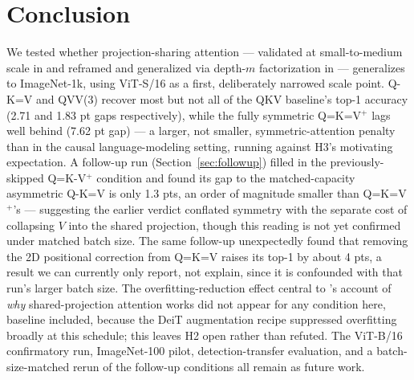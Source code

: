 \documentclass[11pt]{article}
\begin{document}
\section{Conclusion}
\label{sec:conclusion}
We tested whether projection-sharing attention --- validated at
small-to-medium scale in \citet{kayyam2026three} and reframed and
generalized via depth-\(m\) factorization in \citet{gao2026keyless} ---
generalizes to ImageNet-1k, using ViT-S/16 as a first, deliberately narrowed
scale point. Q-K=V and QVV(3) recover most but not all of the QKV baseline's
top-1 accuracy (2.71 and 1.83 pt gaps respectively), while the fully
symmetric Q=K=V\(^+\) lags well behind (7.62 pt gap) --- a larger, not
smaller, symmetric-attention penalty than in the causal language-modeling
setting, running against H3's motivating expectation. A follow-up run
(Section~\ref{sec:followup}) filled in the previously-skipped Q=K-V\(^+\)
condition and found its gap to the matched-capacity asymmetric Q-K=V is only
1.3 pts, an order of magnitude smaller than Q=K=V\(^+\)'s --- suggesting the
earlier verdict conflated symmetry with the separate cost of collapsing
\(V\) into the shared projection, though this reading is not yet
confirmed under matched batch size. The same follow-up unexpectedly found
that removing the 2D positional correction from Q=K=V raises its top-1 by
about 4 pts, a result we can currently only report, not explain, since it is
confounded with that run's larger batch size. The
overfitting-reduction effect central to \citet{gao2026keyless}'s account of
\emph{why} shared-projection attention works did not appear for any
condition here, baseline included, because the DeiT augmentation recipe
suppressed overfitting broadly at this schedule; this leaves H2 open rather
than refuted. The ViT-B/16 confirmatory run, ImageNet-100 pilot,
detection-transfer evaluation, and a batch-size-matched rerun of the
follow-up conditions all remain as future work.
\end{document}
